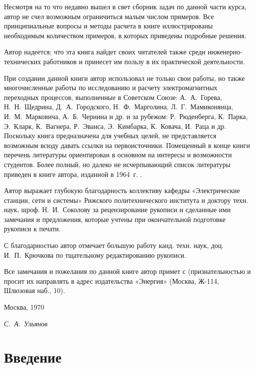 Несмотря на то что недавно вышел в свет сборник задач по данной части курса, автор не счел возможным ограничиться малым числом примеров. Все принципиальные вопросы и методы расчета в книге иллюстрированы необходимым количеством примеров, в которых приведены подробные решения.

Автор надеется; что эта книга найдет своих читателей также среди инженерно-технических работников и принесет им пользу в их практической деятельности.

При создании данной книги автор использовал не только свои работы, но также многочисленные работы по исследованию и расчету электромагнитных переходных процессов, выполненные в Советском Союзе: А.~А.~Горева, Н.~Н.~Щедрина, Д.~А.~Городского, Н.~Ф.~Марголина, Л.~Г.~Мамиконянца, И.~М.~Марковича, А.~Б.~Чернина и др. и за рубежом: Р.~Рюденберга, К.~Парка, Э.~Кларк, К.~Вагнера, Р.~Эванса, Э.~Кимбарка, К.~Ковача, И.~Раца и др. Поскольку книга предназначена для учебных целей, не представляется возможным всюду давать ссылки на первоисточники. Помещенный в конце книги перечень литературы ориентирован в основном на интересы и возможности студентов. Более полный, но далеко не исчерпывающий список литературы приведен в книге автора, изданной в 1964~г. \cite{04Ulianov64}.

Автор выражает глубокую благодарность коллективу кафедры «Электрические станции, сети и системы» Рижского политехнического института и доктору техн. наук, шроф. Н.~И.~Соколову за рецензирование рукописи и сделанные ими замечания и предложения, которые учтены при окончательной подготовке рукописи к печати.

С благодарностью автор отмечает большую работу канд. техн. наук, доц. И.~П.~Крючкова по тщательному редактированию рукописи.

Все замечания и пожелания по данной книге автор примет с (признательностью и просит их направлять в адрес издательства «Энергия» (Москва, Ж-114, Шлюзовая наб., 10).

\vspace{1pc}
\begin{minipage}{0.49\linewidth}
	Москва, 1970
\end{minipage}
\hfill
\begin{minipage}{0.49\linewidth}
	\flushright
	\textit{С.~А.~Ульянов}
\end{minipage}

\chapter*{Введение}
\label{chap:0 intro}

